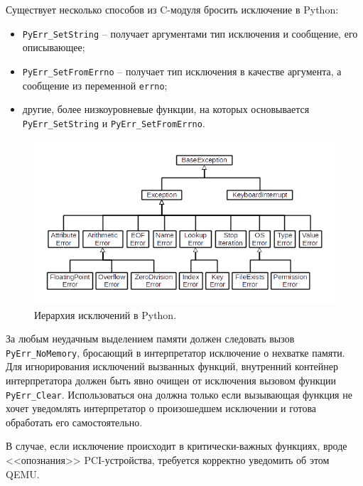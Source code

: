 Существует несколько способов из C-модуля бросить исключение в Python:
\begin{itemize}
    \item \texttt{PyErr\_SetString} -- получает аргументами тип исключения
        и сообщение, его описывающее;
    \item \texttt{PyErr\_SetFromErrno} -- получает тип исключения в качестве
        аргумента, а сообщение из переменной \texttt{errno};
    \item другие, более низкоуровневые функции, на которых основывается
        \texttt{PyErr\_SetString} и \texttt{PyErr\_SetFromErrno}.
\end{itemize}

\begin{figure}[!htbp]
    \centering
    \begin{adjustbox}{max totalsize={\textwidth}{\textheight}}
        \includegraphics[]{images/python_exception_hierarchy.png}
    \end{adjustbox}
    \caption{Иерархия исключений в Python.}\label{fig:python-exception-hierarchy}
\end{figure}

За любым неудачным выделением памяти должен следовать вызов \texttt{PyErr\_NoMemory},
бросающий в интерпретатор исключение о нехватке памяти.
Для игнорирования исключений вызванных функций, внутренний контейнер интерпретатора должен
быть явно очищен от исключения вызовом функции \texttt{PyErr\_Clear}.
Использоваться она должна только если вызывающая функция не хочет уведомлять интерпретатор
о произошедшем исключении и готова обработать его самостоятельно.

В случае, если исключение происходит в критически-важных функциях, вроде <<опознания>>
PCI-устройства, требуется корректно уведомить об этом QEMU.

